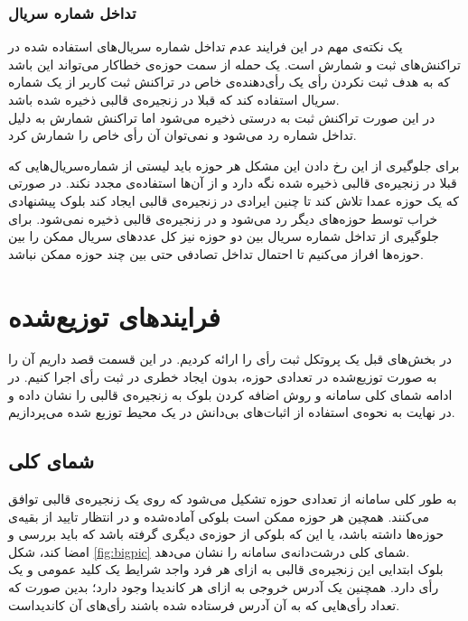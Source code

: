 \subsubsection{تداخل شماره سریال}
یک نکته‌ی مهم در این فرایند عدم تداخل شماره سریال‌های استفاده شده در تراکنش‌های ثبت و شمارش است. یک حمله از سمت حوزه‌ی خطاکار می‌تواند این باشد که به هدف ثبت نکردن رأی یک رأی‌دهنده‌ی خاص در تراکنش ثبت کاربر از یک شماره سریال استفاده کند که قبلا در زنجیره‌ی قالبی ذخیره شده باشد. 
\\
در این صورت تراکنش ثبت به درستی ذخیره می‌شود اما تراکنش شمارش به دلیل تداخل شماره رد می‌شود و نمی‌توان آن رأی خاص را شمارش کرد. 
\par 
برای جلوگیری از این رخ دادن این مشکل هر حوزه باید لیستی از شماره‌سریال‌هایی که قبلا در زنجیره‌ی قالبی ذخیره شده نگه دارد و از آن‌ها استفاده‌ی مجدد نکند. در صورتی که یک حوزه عمدا تلاش کند تا چنین ایرادی در زنجیره‌ی قالبی ایجاد کند بلوک پیشنهادی خراب توسط حوزه‌های دیگر رد می‌شود و در زنجیره‌ی قالبی ذخیره نمی‌شود. برای جلوگیری از تداخل شماره سریال بین دو حوزه نیز کل عددهای سریال ممکن را بین حوزه‌ها افراز می‌کنیم تا احتمال تداخل تصادفی حتی بین چند حوزه ممکن نباشد.
\section{فرایند‌های توزیع‌شده}
در بخش‌های قبل یک پروتکل ثبت رأی‌ را ارائه کردیم. در این قسمت قصد داریم آن را به صورت توزیع‌شده در تعدادی حوزه، بدون ایجاد خطری در ثبت رأی اجرا کنیم. در ادامه شمای کلی سامانه و روش‌ اضافه کردن بلوک به زنجیره‌ی قالبی را نشان داده و در نهایت به نحوه‌ی استفاده از اثبات‌های بی‌دانش در یک محیط توزیع شده می‌پردازیم.
\subsection{شمای کلی}
به طور کلی سامانه از تعدادی حوزه‌ تشکیل می‌شود که روی یک زنجیره‌ی قالبی توافق می‌کنند. همچین هر حوزه ممکن است بلوکی آماده‌شده و در انتظار تایید از بقیه‌ی حوزه‌ها داشته باشد، یا این که بلوکی از حوزه‌ی دیگری گرفته باشد که باید بررسی و امضا کند، شکل \ref{fig:bigpic} شمای کلی درشت‌دانه‌ی سامانه را نشان می‌دهد.
\\
بلوک ابتدایی این زنجیره‌ی قالبی به ازای هر فرد واجد شرایط یک کلید عمومی و یک رأی ‌دارد. همچنین یک آدرس خروجی به ازای هر کاندیدا وجود دارد؛ بدین صورت که تعداد رأی‌هایی که به آن آدرس فرستاده شده باشند رأی‌های آن‌ کاندیداست. 
 
